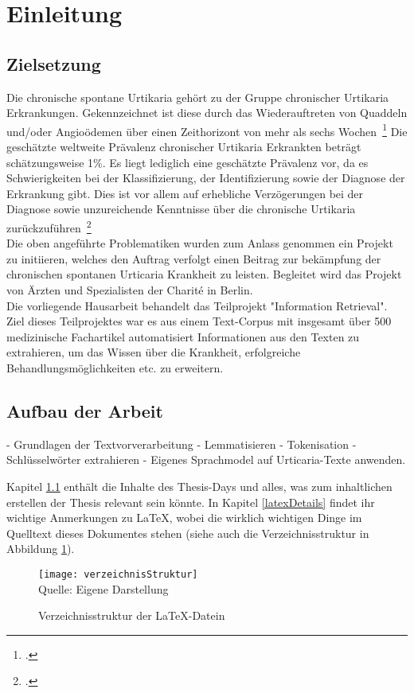 \section{Einleitung}\label{infos}

\subsection{Zielsetzung}\label{infos}

Die chronische spontane Urtikaria gehört zu der Gruppe chronischer Urtikaria Erkrankungen. Gekennzeichnet ist diese
durch das Wiederauftreten von Quaddeln und/oder Angioödemen über einen Zeithorizont von mehr als sechs
Wochen~\footcite[\vglf][]{savic.2020}
Die geschätzte weltweite Prävalenz chronischer Urtikaria Erkrankten beträgt schätzungsweise 1\%. Es liegt lediglich eine
geschätzte Prävalenz vor, da es Schwierigkeiten bei der Klassifizierung, der Identifizierung sowie der Diagnose der
Erkrankung gibt. Dies ist vor allem auf erhebliche Verzögerungen bei der Diagnose sowie unzureichende Kenntnisse über
die chronische Urtikaria zurückzuführen~\footcite[\vglf][]{savic.2020}\\

Die oben angeführte Problematiken wurden zum Anlass genommen ein Projekt zu initiieren, welches den Auftrag verfolgt
einen Beitrag zur bekämpfung der chronischen spontanen Urticaria Krankheit zu leisten. Begleitet wird das Projekt von
Ärzten und Spezialisten der Charité in Berlin.\\

Die vorliegende Hausarbeit behandelt das Teilprojekt "Information Retrieval". Ziel dieses Teilprojektes war es aus einem
Text-Corpus mit insgesamt über 500 medizinische Fachartikel automatisiert Informationen aus den Texten zu extrahieren,
um das Wissen über die Krankheit, erfolgreiche Behandlungsmöglichkeiten etc. zu erweitern.\\

\subsection{Aufbau der Arbeit}
- Grundlagen der Textvorverarbeitung
- Lemmatisieren
- Tokenisation
- Schlüsselwörter extrahieren
- Eigenes Sprachmodel auf Urticaria-Texte anwenden.

Kapitel \ref{infos} enthält die Inhalte des Thesis-Days und alles, was zum inhaltlichen erstellen der Thesis relevant sein könnte.
In Kapitel \ref{latexDetails}  findet ihr wichtige Anmerkungen zu \LaTeX{}, wobei die wirklich wichtigen Dinge im Quelltext dieses Dokumentes stehen (siehe auch die Verzeichnisstruktur in Abbildung \ref{fig:verzeichnisStruktur}).


\begin{figure}[H]
\caption{Verzeichnisstruktur der \LaTeX{}-Datein}\label{fig:verzeichnisStruktur}
\texttt{[image: verzeichnisStruktur]}
\\
Quelle: Eigene Darstellung
\end{figure}
